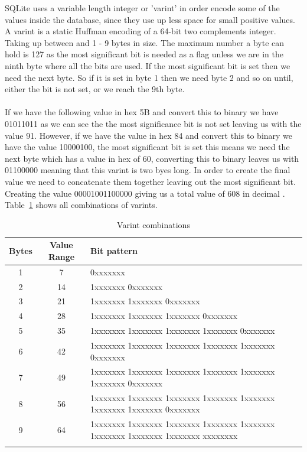 SQLite uses a variable length integer or 'varint' in order encode some of the values inside the database, since they use up less space for small positive values. A varint is a static Huffman encoding of a 64-bit two complements integer. Taking up between and 1 - 9 bytes in size. The maximum number a byte can hold is 127 as the most significant bit is needed as a flag unless we are in the ninth byte where all the bits are used. If the most significant bit is set then we need the next byte. So if it is set in byte 1 then we need byte 2 and so on until, either the bit is not set, or we reach the 9th byte.
\\\\
If we have the following value in hex 5B and convert this to binary we have 01011011 as we can see the the most significance bit is not set leaving us with the value 91. However, if we have the value in hex 84 and convert this to binary we have the value 10000100, the most significant bit is set this means we need the next byte which has a value in hex of 60, converting this to binary leaves us with  01100000 meaning that this varint is two byes long. In order to create the final value we need to concatenate them together leaving out the most significant bit. Creating the value 00001001100000 giving us a total value of 608 in decimal \citep{sausagefactory}. Table~\ref{tbl:varints} shows  all combinations of varints. 

\begin{longtable}[h]{| c | c | p{10cm} |}
		\hline
			\textbf{Bytes} & \textbf{Value Range} & \textbf{Bit pattern} \\ 
		\hline
		\endhead
			1 & 7 &  0xxxxxxx \\ \hline
			2 & 14 & 1xxxxxxx 0xxxxxxx\\ \hline
			3 & 21 & 1xxxxxxx 1xxxxxxx 0xxxxxxx\\ \hline
			4 & 28 & 1xxxxxxx 1xxxxxxx 1xxxxxxx 0xxxxxxx\\ \hline
			5 & 35 & 1xxxxxxx 1xxxxxxx 1xxxxxxx 1xxxxxxx 0xxxxxxx\\ \hline
			6 & 42 & 1xxxxxxx 1xxxxxxx 1xxxxxxx 1xxxxxxx 1xxxxxxx 0xxxxxxx\\ \hline
			7 & 49 & 1xxxxxxx 1xxxxxxx 1xxxxxxx 1xxxxxxx 1xxxxxxx 1xxxxxxx 0xxxxxxx\\ \hline
			8 & 56 & 1xxxxxxx 1xxxxxxx 1xxxxxxx 1xxxxxxx 1xxxxxxx 1xxxxxxx 1xxxxxxx 0xxxxxxx\\ \hline
			9 & 64 & 1xxxxxxx 1xxxxxxx 1xxxxxxx 1xxxxxxx 1xxxxxxx 1xxxxxxx 1xxxxxxx 1xxxxxxx xxxxxxxx\\
		\hline
	\caption{Varint combinations \cite{sqliteray}}
	\label{tbl:varints}
\end{longtable}

